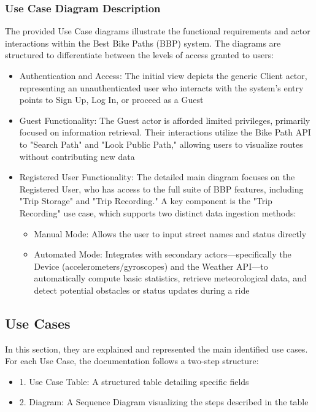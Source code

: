 \subsubsection{Use Case Diagram Description}
The provided Use Case diagrams illustrate the functional requirements and actor interactions within the Best Bike Paths (BBP) system. The diagrams are structured to differentiate between the levels of access granted to users:
\begin{itemize}
    \item Authentication and Access: The initial view depicts the generic Client actor, representing an unauthenticated user who interacts with the system's entry points to Sign Up, Log In, or proceed as a Guest
    \item Guest Functionality: The Guest actor is afforded limited privileges, primarily focused on information retrieval. Their interactions utilize the Bike Path API to "Search Path" and "Look Public Path," allowing users to visualize routes without contributing new data
    \item Registered User Functionality: The detailed main diagram focuses on the Registered User, who has access to the full suite of BBP features, including "Trip Storage" and "Trip Recording." A key component is the "Trip Recording" use case, which supports two distinct data ingestion methods:
        \begin{itemize}
            \item Manual Mode: Allows the user to input street names and status directly
            \item Automated Mode: Integrates with secondary actors—specifically the Device (accelerometers/gyroscopes) and the Weather API—to automatically compute basic statistics, retrieve meteorological data, and detect potential obstacles or status updates during a ride
        \end{itemize}
\end{itemize}

\vspace{5cm}

\subsection{Use Cases}
In this section, they are explained and represented the main identified use cases.  
For each Use Case, the documentation follows a two-step structure:
\begin{itemize}
    \item 1. Use Case Table: A structured table detailing specific fields
    \item 2. Diagram: A Sequence Diagram visualizing the steps described in the table
\end{itemize}

